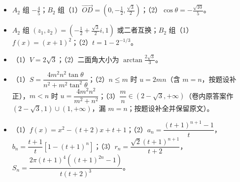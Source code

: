 \begin{itemize}[leftmargin=2.6em]
  \item[\textbf{21.}] $A_2$ 组 $-\frac45$；$B_2$ 组（1）$\overrightarrow{OD}=\left(0,-\frac12,\frac{\sqrt3}{2}\right)$；（2）$\cos\theta=-\frac{\sqrt{10}}5$。
  \item[\textbf{22.}] $A_2$ 组 $(z_1,z_2)=\left(-\frac12+\frac{\sqrt3}{2}i,1\right)$ 或二者互换；$B_2$ 组（1）$f(x)=(x+1)^2$；（2）$t=1-2^{-1/3}$。
  \item[\textbf{23.}] （1）$V=2\sqrt3$；（2）二面角大小为 $\arctan\frac{2\sqrt3}{3}$。
  \item[\textbf{24.}] （1）$S=\dfrac{4m^2n^2\tan\theta}{n^2+m^2\tan^2\theta}$；（2）$n\le m$ 时 $u=2mn$（含 $m=n$，按题设补正），$m<n$ 时 $u=\dfrac{4m^2n^2}{m^2+n^2}$；（3）$\dfrac mn\in(2-\sqrt3,+\infty)$（卷内原答案作 $(2-\sqrt3,1)\cup(1,+\infty)$，漏 $m=n$；按题设补全并保留原文）。
  \item[\textbf{25.}] （1）$f(x)=x^2-(t+2)x+t+1$；（2）$a_n=\dfrac{(t+1)^{n+1}-1}{t}$，$b_n=\dfrac{t+1}{t}\left[1-(t+1)^n\right]$；（3）$r_n=\dfrac{\sqrt2(t+1)^{n+1}}{t+2}$，$S_n=\dfrac{2\pi(t+1)^4\left((t+1)^{2n}-1\right)}{t(t+2)^3}$。
\end{itemize}
